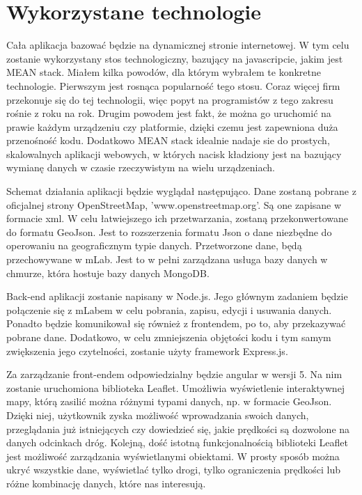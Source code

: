 


\section{Wykorzystane technologie}
\label{sec:wykorzystaneTechnologie}
	Cała aplikacja bazować będzie na dynamicznej stronie internetowej. W tym celu zostanie wykorzystany stos technologiczny, bazujący na javascripcie, jakim jest MEAN stack. Miałem kilka powodów, dla którym wybrałem te konkretne technologie. Pierwszym jest rosnąca popularność tego stosu. Coraz więcej firm przekonuje się do tej technologii, więc popyt na programistów z tego zakresu rośnie z roku na rok. Drugim powodem jest fakt, że można go uruchomić na prawie każdym urządzeniu czy platformie, dzięki czemu jest zapewniona duża przenośność kodu. Dodatkowo MEAN stack idealnie nadaje sie do prostych, skalowalnych aplikacji webowych, w których nacisk kładziony jest na bazujący wymianę danych w czasie rzeczywistym na wielu urządzeniach. 
	
	Schemat działania aplikacji będzie wyglądał następująco. Dane zostaną pobrane z oficjalnej strony OpenStreetMap, 'www.openstreetmap.org'. Są one zapisane w formacie xml. W celu łatwiejszego ich przetwarzania, zostaną przekonwertowane do formatu GeoJson. Jest to rozszerzenia formatu Json o dane niezbędne do operowaniu na geograficznym typie danych. Przetworzone dane, będą przechowywane w mLab. Jest to w pełni zarządzana usługa bazy danych w chmurze, która hostuje bazy danych MongoDB. 

	Back-end aplikacji zostanie napisany w Node.js. Jego głównym zadaniem będzie połączenie  się z mLabem w celu pobrania, zapisu, edycji i usuwania danych. Ponadto będzie komunikował się również z frontendem, po to, aby przekazywać pobrane dane.  Dodatkowo, w celu zmniejszenia objętości kodu i tym samym zwiększenia jego czytelności, zostanie użyty framework Express.js. 

	Za zarządzanie front-endem odpowiedzialny będzie angular w wersji 5. Na nim zostanie uruchomiona biblioteka Leaflet. Umożliwia wyświetlenie interaktywnej mapy, którą zasilić można różnymi typami danych, np. w formacie GeoJson. Dzięki niej, użytkownik zyska możliwość wprowadzania swoich danych, przeglądania już istniejących czy dowiedzieć się, jakie prędkości są dozwolone na danych odcinkach dróg. Kolejną, dość istotną funkcjonalnością biblioteki Leaflet jest możliwość zarządzania wyświetlanymi obiektami. W prosty sposób można ukryć wszystkie dane, wyświetlać tylko drogi, tylko ograniczenia prędkości lub różne kombinację danych, które nas interesują. 
	

